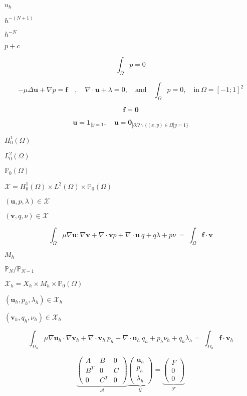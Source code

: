 \documentclass{article}
\begin{document}
$u_h$
\pagebreak

$h^{-(N+1)}$
\pagebreak

$h^{-N}$
\pagebreak

$p+c$
\pagebreak

\[ \label{eq:26} \int_\Omega p = 0 \]
\pagebreak

\[ - \mu \Delta \mathbf{u} +\nabla p = \mathbf{f}\quad, \quad \nabla \cdot \mathbf{u} + \lambda = 0, \quad \text{and}\quad \int_\Omega p = 0,\quad \text{in}\ \Omega = [-1;1]^2 \]
\pagebreak

\[ \mathbf{f} = \mathbf{0} \]
\pagebreak

\[ \mathbf{u}=\mathbf{1}_{|y=1}, \quad \mathbf{u}=\mathbf{0}_{|\partial \Omega \backslash \{(x,y) \in \Omega | y=1\}} \]
\pagebreak

$H^1_0(\Omega)$
\pagebreak

$L^2_0(\Omega)$
\pagebreak

$\mathbb{P}_0(\Omega)$
\pagebreak

$\mathcal{X} = H^1_0(\Omega)\times L^2(\Omega)\times\mathbb{P}_0(\Omega)$
\pagebreak

$(\mathbf{u}, p, \lambda) \in \mathcal{X}$
\pagebreak

$(\mathbf{v},q,\nu) \in \mathcal{X}$
\pagebreak

\[ \int_\Omega \mu \nabla \mathbf{u} : \nabla \mathbf{v} + \nabla \cdot \mathbf{v} p + \nabla \cdot \mathbf{u}\ q + q \lambda + p \nu \ = \ \int_\Omega \mathbf{f} \cdot \mathbf{v} \]
\pagebreak

$M_h$
\pagebreak

$\mathbb{P}_N/\mathbb{P}_{N-1}$
\pagebreak

$\mathcal{X}_h=X_h\times M_h \times \mathbb{P}_0(\Omega)$
\pagebreak

$(\mathbf{u}_h,p_h,\lambda_h) \in \mathcal{X}_h$
\pagebreak

$(\mathbf{v}_h,q_h,\nu_h) \in \mathcal{X}_h$
\pagebreak

\[ \label{eq:27} \int_{\Omega_h} \mu \nabla \mathbf{u}_h \cdot \nabla \mathbf{v}_h + \nabla \cdot \mathbf{v}_h \ p_h + \nabla \cdot \mathbf{u}_h\ q_h + p_h \nu_h + q_h \lambda_h = \ \int_{\Omega_h} \mathbf{f} \cdot \mathbf{v}_h \]
\pagebreak

\[ \label{eq:28} \underbrace{\begin{pmatrix} A & B & 0\\ B^T & 0 & C\\ 0 & C^T & 0 \end{pmatrix}}_{\mathcal{A}} \underbrace{ \begin{pmatrix} \mathbf{u}_h\\ p_h\\ \lambda_h \end{pmatrix}}_{\mathcal{U}} = \underbrace{\begin{pmatrix} F\\ 0\\ 0 \end{pmatrix}}_{\mathcal{F}} \]
\pagebreak
\end{document}
